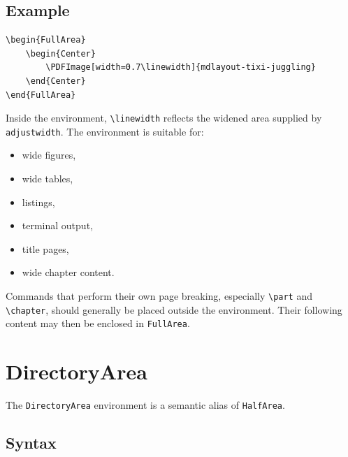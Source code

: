 \documentclass[
11pt,
a4paper,
oneside
]{scrbook}
\begin{document}
\subsection{Example}
\begin{FullArea}
	\begin{Center}
	\end{Center}
\end{FullArea}
\begin{verbatim}
\begin{FullArea}
	\begin{Center}
		\PDFImage[width=0.7\linewidth]{mdlayout-tixi-juggling}
	\end{Center}
\end{FullArea}
\end{verbatim}
Inside the environment, \verb|\linewidth| reflects the widened area supplied
by \texttt{adjustwidth}.
The environment is suitable for:
\begin{itemize}
	\item wide figures,
	\item wide tables,
	\item listings,
	\item terminal output,
	\item title pages,
	\item wide chapter content.
\end{itemize}
Commands that perform their own page breaking, especially \verb|\part| and
\verb|\chapter|, should generally be placed outside the environment.
Their following content may then be enclosed in \texttt{FullArea}.

\section{DirectoryArea}

The \texttt{DirectoryArea} environment is a semantic alias of
\texttt{HalfArea}.

\subsection{Syntax}
\end{document}
